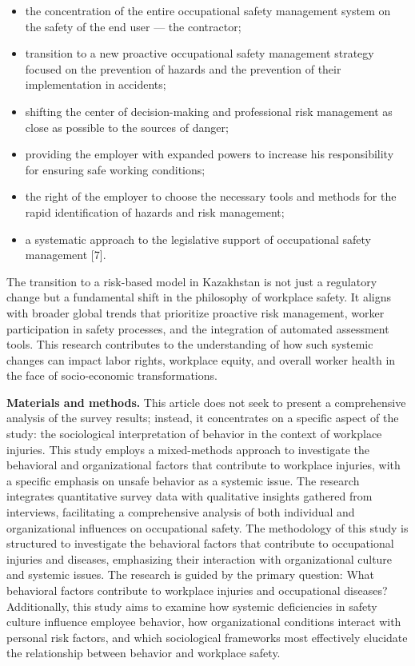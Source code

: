 \begin{itemize}
\item
  the concentration of the entire occupational safety management system
  on the safety of the end user --- the contractor;
\item
  transition to a new proactive occupational safety management strategy
  focused on the prevention of hazards and the prevention of their
  implementation in accidents;
\item
  shifting the center of decision-making and professional risk
  management as close as possible to the sources of danger;
\item
  providing the employer with expanded powers to increase his
  responsibility for ensuring safe working conditions;
\item
  the right of the employer to choose the necessary tools and methods
  for the rapid identification of hazards and risk management;
\item
  a systematic approach to the legislative support of occupational
  safety management {[}7{]}.
\end{itemize}

The transition to a risk-based model in Kazakhstan is not just a
regulatory change but a fundamental shift in the philosophy of workplace
safety. It aligns with broader global trends that prioritize proactive
risk management, worker participation in safety processes, and the
integration of automated assessment tools. This research contributes to
the understanding of how such systemic changes can impact labor rights,
workplace equity, and overall worker health in the face of
socio-economic transformations.

{\bfseries Materials and methods.} This article does not seek to present a
comprehensive analysis of the survey results; instead, it concentrates
on a specific aspect of the study: the sociological interpretation of
behavior in the context of workplace injuries. This study employs a
mixed-methods approach to investigate the behavioral and organizational
factors that contribute to workplace injuries, with a specific emphasis
on unsafe behavior as a systemic issue. The research integrates
quantitative survey data with qualitative insights gathered from
interviews, facilitating a comprehensive analysis of both individual and
organizational influences on occupational safety. The methodology of
this study is structured to investigate the behavioral factors that
contribute to occupational injuries and diseases, emphasizing their
interaction with organizational culture and systemic issues. The
research is guided by the primary question: What behavioral factors
contribute to workplace injuries and occupational diseases?
Additionally, this study aims to examine how systemic deficiencies in
safety culture influence employee behavior, how organizational
conditions interact with personal risk factors, and which sociological
frameworks most effectively elucidate the relationship between behavior
and workplace safety.

